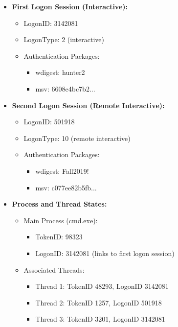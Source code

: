 \begin{itemize}
   \item \textbf{First Logon Session (Interactive):}
   \begin{itemize}
       \item LogonID: 3142081
       \item LogonType: 2 (interactive)
       \item Authentication Packages:
       \begin{itemize}
           \item wdigest: hunter2
           \item msv: 6608e4bc7b2...
       \end{itemize}
   \end{itemize}
   
   \item \textbf{Second Logon Session (Remote Interactive):}
   \begin{itemize}
       \item LogonID: 501918
       \item LogonType: 10 (remote interactive)
       \item Authentication Packages:
       \begin{itemize}
           \item wdigest: Fall2019!
           \item msv: c077ee82b5fb...
       \end{itemize}
   \end{itemize}
   
   \item \textbf{Process and Thread States:}
   \begin{itemize}
       \item Main Process (cmd.exe):
       \begin{itemize}
           \item TokenID: 98323
           \item LogonID: 3142081 (links to first logon session)
       \end{itemize}
       
       \item Associated Threads:
       \begin{itemize}
           \item Thread 1: TokenID 48293, LogonID 3142081
           \item Thread 2: TokenID 1257, LogonID 501918
           \item Thread 3: TokenID 3201, LogonID 3142081
       \end{itemize}
   \end{itemize}
\end{itemize}

